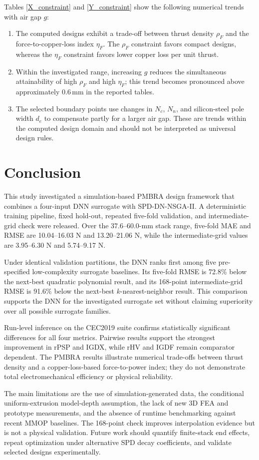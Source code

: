 \par Tables \ref{X_constraint} and \ref{Y_constraint} show the following numerical trends with air gap $g$:
\begin{enumerate}
	\item[F1)] The computed designs exhibit a trade-off between thrust density $\rho_F$ and the force-to-copper-loss index $\eta_F$. The $\rho_F$ constraint favors compact designs, whereas the $\eta_F$ constraint favors lower copper loss per unit thrust.
	\item[F2)] Within the investigated range, increasing $g$ reduces the simultaneous attainability of high $\rho_F$ and high $\eta_F$; this trend becomes pronounced above approximately $0.6\,\mathrm{mm}$ in the reported tables.
	\item[F3)] The selected boundary points use changes in $N_c$, $N_n$, and silicon-steel pole width $d_e$ to compensate partly for a larger air gap. These are trends within the computed design domain and should not be interpreted as universal design rules.
\end{enumerate}


\section{Conclusion}
This study investigated a simulation-based PMBRA design framework that combines a four-input DNN surrogate with SPD-DN-NSGA-II. A deterministic training pipeline, fixed hold-out, repeated five-fold validation, and intermediate-grid check were released. Over the 37.6--60.0-mm stack range, five-fold MAE and RMSE are 10.04--16.03 N and 13.20--21.06 N, while the intermediate-grid values are 3.95--6.30 N and 5.74--9.17 N.
\par Under identical validation partitions, the DNN ranks first among five pre-specified low-complexity surrogate baselines. Its five-fold RMSE is 72.8\% below the next-best quadratic polynomial result, and its 168-point intermediate-grid RMSE is 91.6\% below the next-best $k$-nearest-neighbor result. This comparison supports the DNN for the investigated surrogate set without claiming superiority over all possible surrogate families.
\par Run-level inference on the CEC2019 suite confirms statistically significant differences for all four metrics. Pairwise results support the strongest improvement in rPSP and IGDX, while rHV and IGDF remain comparator dependent. The PMBRA results illustrate numerical trade-offs between thrust density and a copper-loss-based force-to-power index; they do not demonstrate total electromechanical efficiency or physical reliability.
\par The main limitations are the use of simulation-generated data, the conditional uniform-extrusion model-depth assumption, the lack of new 3D FEA and prototype measurements, and the absence of runtime benchmarking against recent MMOP baselines. The 168-point check improves interpolation evidence but is not a physical validation. Future work should quantify finite-stack end effects, repeat optimization under alternative SPD decay coefficients, and validate selected designs experimentally.
